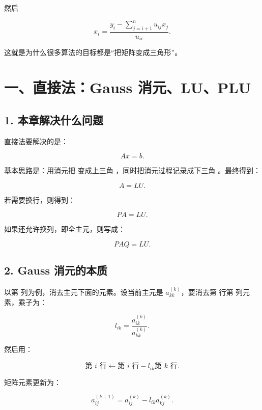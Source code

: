 \documentclass[11pt,a4paper]{ctexart}
\newcommand{\code}[1]{\begingroup\ttfamily\small #1\endgroup}
\begin{document}
然后

\[
x_i=\frac{y_i-\sum_{j=i+1}^n u_{ij}x_j}{u_{ii}}.
\]

这就是为什么很多算法的目标都是“把矩阵变成三角形”。


\section*{一、直接法：Gauss 消元、LU、PLU}



\subsection*{1. 本章解决什么问题}


直接法要解决的是：

\[
Ax=b.
\]

基本思路是：用消元把 \code{} 变成上三角 \code{}，同时把消元过程记录成下三角 \code{}。最终得到：

\[
A=LU.
\]

若需要换行，则得到：

\[
PA=LU.
\]

如果还允许换列，即全主元，则写成：

\[
PAQ=LU.
\]


\subsection*{2. Gauss 消元的本质}


以第 \code{} 列为例，消去主元下面的元素。设当前主元是 $a_{kk}^{(k)}$，要消去第 \code{} 行第 \code{} 列元素，乘子为：

\[
l_{ik}=\frac{a_{ik}^{(k)}}{a_{kk}^{(k)}}.
\]

然后用：

\[
\text{第 } i \text{ 行}\leftarrow \text{第 } i \text{ 行}-l_{ik}\text{第 } k \text{ 行}.
\]

矩阵元素更新为：

\[
a_{ij}^{(k+1)}=a_{ij}^{(k)}-l_{ik}a_{kj}^{(k)}.
\]
\end{document}
